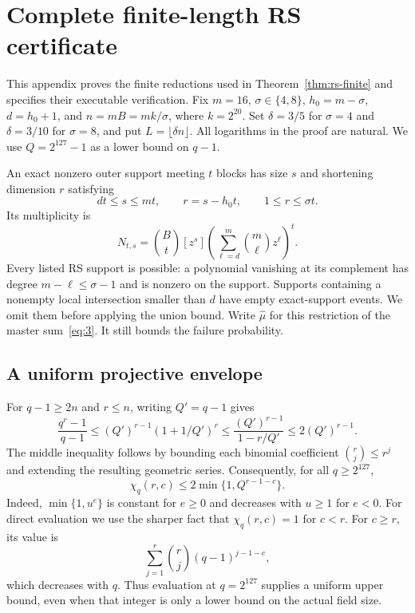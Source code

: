 \section{Complete finite-length RS certificate}
\label{app:rs-certificate}

This appendix proves the finite reductions used in
Theorem~\ref{thm:rs-finite} and specifies their executable verification.
Fix $m=16$, $\sigma\in\{4,8\}$, $h_0=m-\sigma$, $d=h_0+1$, and
$n=mB=mk/\sigma$, where $k=2^{20}$.  Set $\delta=3/5$ for $\sigma=4$
and $\delta=3/10$ for $\sigma=8$, and put $L=\lfloor\delta n\rfloor$.
All logarithms in the proof are natural.  We use
$Q=2^{127}-1$ as a lower bound on $q-1$.

An exact nonzero outer support meeting $t$ blocks has size $s$ and shortening
dimension $r$ satisfying
\[
 dt\le s\le mt,\qquad r=s-h_0t,\qquad 1\le r\le\sigma t.
\]
Its multiplicity is
\begin{equation}
 N_{t,s}=\binom Bt[z^s]
     \left(\sum_{\ell=d}^m\binom m\ell z^\ell\right)^t.
 \label{eq:rs-support-count}
\end{equation}
Every listed RS support is possible: a polynomial vanishing at its
complement has degree $m-\ell\le\sigma-1$ and is nonzero on the support.
Supports containing a nonempty local intersection smaller than $d$ have
empty exact-support events.  We omit them before applying the union bound.
Write $\widehat\mu$ for this restriction of the master sum~\eqref{eq:3}.
It still bounds the failure probability.

\subsection{A uniform projective envelope}

For $q-1\ge2n$ and $r\le n$, writing $Q'=q-1$ gives
\[
 \frac{q^r-1}{q-1}
 \le (Q')^{r-1}(1+1/Q')^r
 \le \frac{(Q')^{r-1}}{1-r/Q'}
 \le 2(Q')^{r-1}.
\]
The middle inequality follows by bounding each binomial coefficient
$\binom rj\le r^j$ and extending the resulting geometric series.
Consequently, for all $q\ge2^{127}$,
\begin{equation}
 \chi_q(r,c)\le 2\min\{1,Q^{r-1-c}\}.
 \label{eq:rs-chi-envelope}
\end{equation}
Indeed, $\min\{1,u^e\}$ is constant for $e\ge0$ and decreases with
$u\ge1$ for $e<0$.  For direct evaluation we use the sharper fact that
$\chi_q(r,c)=1$ for $c<r$.  For $c\ge r$, its value is
\[
 \sum_{j=1}^r\binom rj (q-1)^{j-1-c},
\]
which decreases with $q$.  Thus evaluation at $q=2^{127}$ supplies a
uniform upper bound, even when that integer is only a lower bound on the
actual field size.

